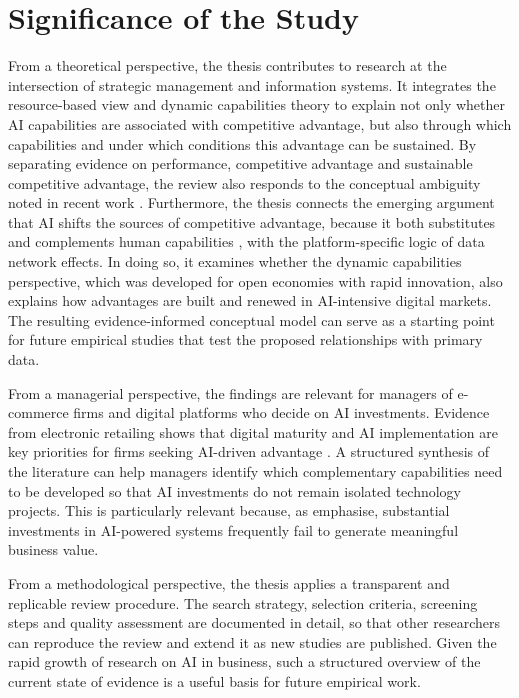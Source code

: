 \section{Significance of the Study}
\label{sec:significance}

From a theoretical perspective, the thesis contributes to research at the intersection of strategic management and information systems. It integrates the resource-based view and dynamic capabilities theory to explain not only whether AI capabilities are associated with competitive advantage, but also through which capabilities and under which conditions this advantage can be sustained. By separating evidence on performance, competitive advantage and sustainable competitive advantage, the review also responds to the conceptual ambiguity noted in recent work \parencite[1]{wu2026}. Furthermore, the thesis connects the emerging argument that AI shifts the sources of competitive advantage, because it both substitutes and complements human capabilities \parencite[1425]{krakowski2023}, with the platform-specific logic of data network effects. In doing so, it examines whether the dynamic capabilities perspective, which was developed for open economies with rapid innovation, also explains how advantages are built and renewed in AI-intensive digital markets. The resulting evidence-informed conceptual model can serve as a starting point for future empirical studies that test the proposed relationships with primary data.

From a managerial perspective, the findings are relevant for managers of e-commerce firms and digital platforms who decide on AI investments. Evidence from electronic retailing shows that digital maturity and AI implementation are key priorities for firms seeking AI-driven advantage \parencite[1]{bunea2026}. A structured synthesis of the literature can help managers identify which complementary capabilities need to be developed so that AI investments do not remain isolated technology projects. This is particularly relevant because, as \textcite[1]{alnofeli2026} emphasise, substantial investments in AI-powered systems frequently fail to generate meaningful business value.

From a methodological perspective, the thesis applies a transparent and replicable review procedure. The search strategy, selection criteria, screening steps and quality assessment are documented in detail, so that other researchers can reproduce the review and extend it as new studies are published. Given the rapid growth of research on AI in business, such a structured overview of the current state of evidence is a useful basis for future empirical work.

